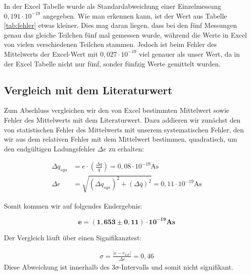 \documentclass{article}
\begin{document}
In der Excel Tabelle wurde als Standardabweichung einer Einzelmessung $0,191 \cdot 10^{-19}$ angegeben. Wie man erkennen kann, ist der Wert aus Tabelle \ref{tab:fehler} etwas kleiner. Dies mag daran liegen, dass bei den fünf Messungen genau das gleiche Teilchen fünf mal gemessen wurde, während die Werte in Excel von vielen verschiedenen Teilchen stammen. Jedoch ist beim Fehler des Mittelwerts der Excel-Wert mit $0,027 \cdot 10^{-19}$ viel genauer als unser Wert, da in der Excel Tabelle nicht nur fünf, sonder fünfzig Werte gemittelt wurden.

\newpage

\subsection{Vergleich mit dem Literaturwert}

Zum Abschluss vergleichen wir den von Excel bestimmten Mittelwert sowie Fehler des Mittelwerts mit dem Literaturwert. Dazu addieren wir zunächst den von statistischen Fehler des Mittelwerts mit unserem systematischen Fehler, den wir aus dem relativen Fehler mit dem Mittelwert bestimmen, quadratisch, um den endgültigen Ladungsfehler $\Delta e$ zu erhalten: 

\begin{equation}
    \begin{split}
        \Delta q_{sys} &= e \cdot \left( \frac{\Delta q}{q} \right) =  0,08 \cdot 10^{-19} \text{As} \\
        \Delta e &= \sqrt{(\Delta q_{sys})^2 + (\Delta \overline{q})^2} = 0,11 \cdot 10^{-19} \text{As}
    \end{split}
\end{equation}


Somit kommen wir auf folgendes Endergebnis:

\begin{equation}
    \bm{e} = \bm{(1,653 \pm 0,11) \cdot 10^{-19}} \textbf{As}
\end{equation}

Der Vergleich läuft über einen Signifikanztest:

\begin{equation}
    \begin{split}
        \sigma = \frac{|e-e_{Lit}|}{\Delta e} = 0,46
    \end{split}
\end{equation}
Diese Abweichung ist innerhalb des $3\sigma$-Intervalls und somit nicht signifikant.
\end{document}
